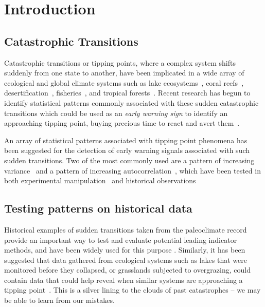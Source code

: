 \documentclass[authoryear,review,12pt]{elsarticle}
\begin{document}
\section{Introduction}

\subsection*{Catastrophic Transitions}

Catastrophic transitions or tipping points, where a complex system 
shifts suddenly from one state to another, have been implicated in
a wide array of ecological and global climate systems such as lake
ecosystems~\citep{Carpenter2011}, coral reefs~\citep{Mumby2007},
desertification~\citep{Kefi2007}, fisheries~\citep{Berkes2006}, and 
tropical forests~\citep{Hirota2011}.  Recent research has begun to
identify statistical patterns commonly associated with these sudden
catastrophic transitions which could be used as an \emph{early warning sign}
to identify an approaching tipping point, buying precious time 
to react and avert them~\citep{Scheffer2009, Lenton2011}.  

An array of statistical patterns associated with tipping point phenomena has
been suggested for the detection of early warning signals associated with
such sudden transitions.  Two of the most commonly used are a pattern of
increasing variance~\citep{Carpenter2006} and a pattern of increasing 
autocorrelation~\citep{vanNes2007}, which have been tested in both experimental
manipulation~\citep{Drake2010, Carpenter2011, Veraart2011} and historical 
observations~\citep{Livina2007,Dakos2008,Lenton2012,Ditlevsen2010,Guttal2008,Thompson2010}


\subsection*{Testing patterns on historical data}

Historical examples of sudden transitions taken from the paleoclimate record
provide an important way to test and evaluate potential leading indicator 
methods, and have been widely used for this purpose 
\citep{Livina2007,Dakos2008,Lenton2012,Ditlevsen2010,Guttal2008,Thompson2010}.
Similarly, it has been suggested that data gathered from ecological systems such
as lakes that were monitored before they collapsed, or grasslands subjected to
overgrazing, could contain data that could help reveal when similar systems 
are approaching a tipping point~\citep{Inman2011}.  This is a silver lining to
the clouds of past catastrophes -- we may be able to learn from our mistakes. 
\end{document}
